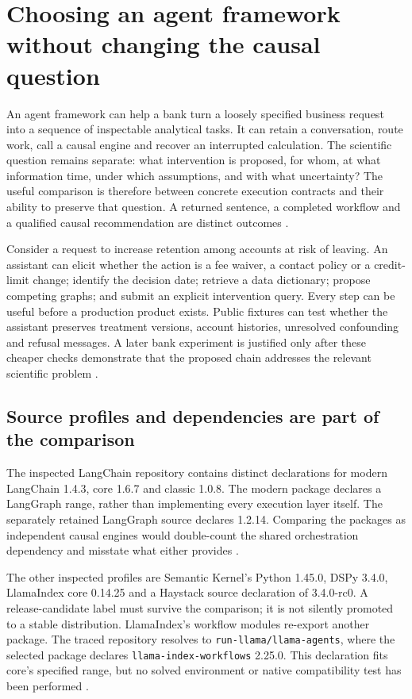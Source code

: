 \section{Choosing an agent framework without changing the causal question}
\label{sec:exec24-framework-census}

An agent framework can help a bank turn a loosely specified business request
into a sequence of inspectable analytical tasks. It can retain a conversation,
route work, call a causal engine and recover an interrupted calculation. The
scientific question remains separate: what intervention is proposed, for whom,
at what information time, under which assumptions, and with what uncertainty?
The useful comparison is therefore between concrete execution contracts and
their ability to preserve that question. A returned sentence, a completed
workflow and a qualified causal recommendation are distinct outcomes
\citep{exec24_framework_contracts}.

Consider a request to increase retention among accounts at risk of leaving.
An assistant can elicit whether the action is a fee waiver, a contact policy
or a credit-limit change; identify the decision date; retrieve a data
dictionary; propose competing graphs; and submit an explicit intervention
query. Every step can be useful before a production product exists. Public
fixtures can test whether the assistant preserves treatment versions,
account histories, unresolved confounding and refusal messages. A later
bank experiment is justified only after these cheaper checks demonstrate
that the proposed chain addresses the relevant scientific problem
\citep{exec24_framework_contracts}.

\subsection{Source profiles and dependencies are part of the comparison}
The inspected LangChain repository contains distinct declarations for
modern LangChain 1.4.3, core 1.6.7 and classic 1.0.8. The modern package
declares a LangGraph range, rather than implementing every execution layer
itself. The separately retained LangGraph source declares 1.2.14.
Comparing the packages as independent causal engines would double-count
the shared orchestration dependency and misstate what either provides
\citep{exec24_framework_langchain,v12_la04_langgraph}.

The other inspected profiles are Semantic Kernel's Python 1.45.0,
DSPy 3.4.0, LlamaIndex core 0.14.25 and a Haystack source declaration of
3.4.0-rc0. A release-candidate label must survive the comparison; it is
not silently promoted to a stable distribution. LlamaIndex's workflow
modules re-export another package. The traced repository resolves to
\texttt{run-llama/llama-agents}, where the selected package declares
\texttt{llama-index-workflows} 2.25.0. This declaration fits core's
specified range, but no solved environment or native compatibility test
has been performed
\citep{exec24_framework_semantic_kernel,exec24_framework_dspy,
exec24_framework_llama_index,exec24_framework_haystack,
exec24_framework_workflows}.

